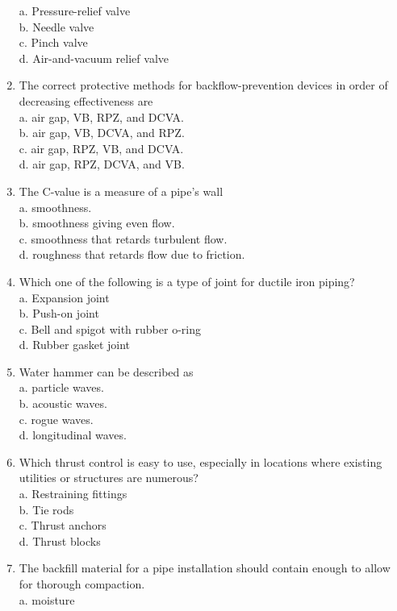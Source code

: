 \begin{enumerate}[1.]
a. Pressure-relief valve\\
b. Needle valve\\
c. Pinch valve\\
d. Air-and-vacuum relief valve\\
\item The correct protective methods for backflow-prevention devices in order of decreasing effectiveness are\\
a. air gap, VB, RPZ, and DCVA.\\
b. air gap, VB, DCVA, and RPZ.\\
c. air gap, RPZ, VB, and DCVA.\\
d. air gap, RPZ, DCVA, and VB.\\
\item The $\mathrm{C}$-value is a measure of a pipe's wall\\
a. smoothness.\\
b. smoothness giving even flow.\\
c. smoothness that retards turbulent flow.\\
d. roughness that retards flow due to friction.\\
\item Which one of the following is a type of joint for ductile iron piping?\\
a. Expansion joint\\
b. Push-on joint\\
c. Bell and spigot with rubber o-ring\\
d. Rubber gasket joint\\
\item Water hammer can be described as\\
a. particle waves.\\
b. acoustic waves.\\
c. rogue waves.\\
d. longitudinal waves.\\
\item Which thrust control is easy to use, especially in locations where existing utilities or structures are numerous?\\
a. Restraining fittings\\
b. Tie rods\\
c. Thrust anchors\\
d. Thrust blocks 
\item The backfill material for a pipe installation should contain enough to allow for thorough compaction.\\
a. moisture\\

\end{enumerate}
